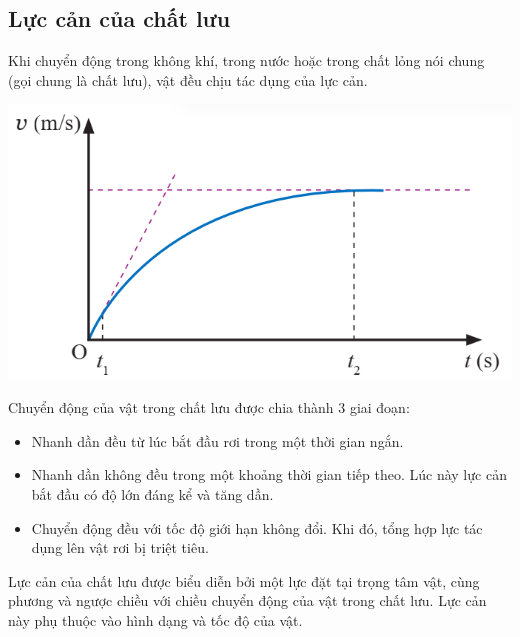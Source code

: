 \subsection{Lực cản của chất lưu}
Khi chuyển động trong không khí, trong nước hoặc trong chất lỏng nói chung (gọi chung là chất lưu), vật đều chịu tác dụng của lực cản.
\begin{center}
	\includegraphics[width=0.4\linewidth]{../figs/VN10-2023-PH-TP020-2}
\end{center}
Chuyển động của vật trong chất lưu được chia thành 3 giai đoạn:
\begin{itemize}
	\item Nhanh dần đều từ lúc bắt đầu rơi trong một thời gian ngắn.
	\item Nhanh dần không đều trong một khoảng thời gian tiếp theo. Lúc này lực cản bắt đầu có độ lớn đáng kể và tăng dần.
	\item Chuyển động đều với tốc độ giới hạn không đổi. Khi đó, tổng hợp lực tác dụng lên vật rơi bị triệt tiêu.
\end{itemize}
Lực cản của chất lưu được biểu diễn bởi một lực đặt tại trọng tâm vật, cùng phương và ngược chiều với chiều chuyển động của vật trong chất lưu. Lực cản này phụ thuộc vào hình dạng và tốc độ của vật.
